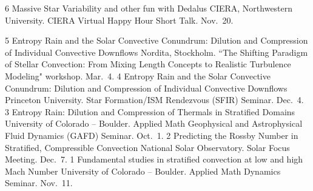 	  {6}
	  {Massive Star Variability and other fun with Dedalus}
	  {
	  	CIERA, Northwestern University. CIERA Virtual Happy Hour Short Talk. Nov.~20.
	  }

\cvpub{}
	  {5}
	  {Entropy Rain and the Solar Convective Conundrum: Dilution and Compression of Individual Convective Downflows}
	  {
	  	Nordita, Stockholm. ``The Shifting Paradigm of Stellar Convection: From Mixing Length Concepts to Realistic Turbulence Modeling" workshop. Mar.~4.
	  }
	  {4}
	  {Entropy Rain and the Solar Convective Conundrum: Dilution and Compression of Individual Convective Downflows}
	  {
	  	Princeton University. Star Formation/ISM Rendezvous (SFIR) Seminar. Dec.~4.
	  }
\cvpub{}
	  {3}
	  {Entropy Rain: Dilution and Compression of Thermals in Stratified Domains}
	  {
	  	University of Colorado -- Boulder. Applied Math Geophysical and Astrophysical Fluid Dynamics (GAFD) Seminar. Oct.~1.
	  }
	  {2}
	  {Predicting the Rossby Number in Stratified, Compressible Convection}
	  {
	  	National Solar Observatory. Solar Focus Meeting. Dec.~7.
	  }
      {1}
      {Fundamental studies in stratified convection at low and high Mach Number}
      {
        University of Colorado -- Boulder. Applied Math Dynamics Seminar. Nov.~11.
      }
